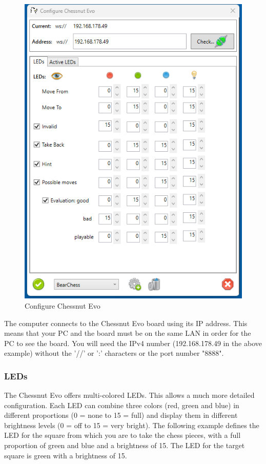 \documentclass[11pt,a4paper]{article}
\begin{document}
\begin{figure}[H]
	\centering
	\includegraphics[scale=0.8]{ChessnutEvo2.png}
	\caption{Configure Chessnut Evo }
	\label{fig:ChessnutEvo4}
\end{figure}
The computer connects to the Chessnut Evo board using its IP address. This means that your PC and the board must be on the same LAN in order for the PC to see the board. You will need the IPv4 number (192.168.178.49 in the above example) without the '//' or ':' characters or the port number "8888".


\subsubsection{LEDs}

The Chessnut Evo offers multi-colored LEDs. This allows a much more detailed configuration. Each LED can combine three colors ({\color{red}red}, {\color{ForestGreen}green} and {\color{blue}blue}) in different proportions (0 = none to 15 = full) and display them in different brightness levels (0 = off to 15 = very bright).
The following example defines the LED for the square from which you are to take the chess pieces, with a full proportion of  {\color{ForestGreen}green} and {\color{blue}blue} and a brightness of 15.
The LED for the target square is {\color{ForestGreen}green} with a brightness of 15.
\end{document}
